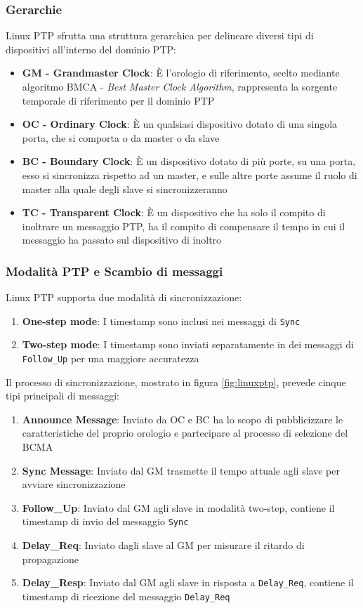 \documentclass[12pt,a4paper,twoside]{book}
\begin{document}
\begin{onehalfspace}
\subsubsection{Gerarchie}
Linux PTP sfrutta una struttura gerarchica per delineare diversi tipi di dispositivi all'interno del dominio PTP:
\begin{itemize}
    \item \textbf{GM - Grandmaster Clock}: È l'orologio di riferimento, scelto mediante algoritmo BMCA - \textit{Best Master Clock Algorithm},
    rappresenta la sorgente temporale di riferimento per il dominio PTP 
    \item \textbf{OC - Ordinary Clock}: È un qualsiasi dispositivo dotato di una singola porta, che si comporta o da master o da slave
    \item \textbf{BC - Boundary Clock}: È un dispositivo dotato di più porte, su una porta, esso si sincronizza rispetto ad un master, e sulle altre porte assume il ruolo di master alla quale degli slave si sincronizzeranno
    \item \textbf{TC - Transparent Clock}: È un dispositivo che ha solo il compito di inoltrare un messaggio PTP, ha il compito di compensare il tempo in cui il messaggio ha passato sul dispositivo di inoltro
\end{itemize}
\subsubsection{Modalità PTP e Scambio di messaggi}
Linux PTP supporta due modalità di sincronizzazione:
\begin{enumerate}
    \item \textbf{One-step mode}: I timestamp sono inclusi nei messaggi di \texttt{Sync}
    \item \textbf{Two-step mode}: I timestamp sono inviati separatamente in dei messaggi di \texttt{Follow\_Up} per una maggiore accuratezza
\end{enumerate}
Il processo di sincronizzazione, mostrato in figura \ref{fig:linuxptp}, prevede cinque tipi principali di messaggi:
\begin{enumerate}
    \item \textbf{Announce Message}: Inviato da OC e BC ha lo scopo di pubblicizzare le caratteristiche del proprio orologio e partecipare al processo di selezione del BCMA
    \item \textbf{Sync Message}: Inviato dal GM trasmette il tempo attuale agli slave per avviare sincronizzazione
    \item \textbf{Follow\_Up}: Inviato dal GM agli slave in modalità two-step, contiene il timestamp di invio del messaggio \texttt{Sync}
    \item \textbf{Delay\_Req}: Inviato dagli slave al GM per misurare il ritardo di propagazione
    \item \textbf{Delay\_Resp}: Inviato dal GM agli slave in risposta a \texttt{Delay\_Req}, contiene il timestamp di ricezione del messaggio  \texttt{Delay\_Req}
\end{enumerate}


\end{onehalfspace}
\end{document}
